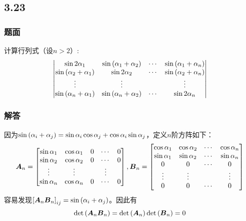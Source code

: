 \documentclass[10pt,xcolor=svgnames]{beamer} %
\begin{document}
\subsection*{3.23}
\begin{frame}
    \frametitle{题面}
    计算行列式（设\(n>2\)）:
    \begin{equation*}
        \begin{vmatrix}
            \sin 2\alpha_1                   & \sin\left( \alpha_{1}+\alpha_{2} \right) & \cdots & \sin\left( \alpha_{1}+\alpha_{n} \right) \\
            \sin\left( \alpha_{2}+\alpha_{1} \right) & \sin 2\alpha_2                   & \cdots & \sin\left( \alpha_{2}+\alpha_{n} \right) \\
            \vdots                           & \vdots                           &        & \vdots                           \\
            \sin\left( \alpha_{n}+\alpha_{1} \right) & \sin\left( \alpha_{n}+\alpha_{2} \right) & \cdots & \sin 2\alpha_n
        \end{vmatrix}
    \end{equation*}
\end{frame}
\begin{frame}
    \frametitle{解答}
    因为\(\sin\left( \alpha_i+\alpha_j \right)=\sin\alpha_i\cos\alpha_j+\cos\alpha_i\sin\alpha_j\)，定义\(n\)阶方阵如下：
    \begin{equation*}
        \boldsymbol{A}_n=
        \begin{bmatrix}
            \sin\alpha_{1} & \cos\alpha_{1} & 0 & \cdots & 0 \\
            \sin\alpha_{2} & \cos\alpha_{2} & 0 & \cdots & 0 \\
            \vdots         & \vdots         &   & \vdots     \\
            \sin\alpha_{n} & \cos\alpha_{n} & 0 & \cdots & 0
        \end{bmatrix},
        \boldsymbol{B}_n=
        \begin{bmatrix}
            \cos\alpha_{1} & \cos\alpha_{2} & \cdots & \cos\alpha_{n} \\
            \sin\alpha_{1} & \sin\alpha_{2} & \cdots & \sin\alpha_{n} \\
            0              & 0              & \cdots & 0              \\
            \vdots         & \vdots         &        & \vdots         \\
            0              & 0              & \cdots & 0
        \end{bmatrix}
    \end{equation*}
    容易发现\(\left[ \boldsymbol{A}_n\boldsymbol{B}_n \right]_{ij}=\sin\left( \alpha_i+\alpha_j \right)\)。因此有
    \begin{equation*}
        \mathrm{det}\left( \boldsymbol{A}_n\boldsymbol{B}_n \right)=\mathrm{det}\left( \boldsymbol{A}_n \right)\mathrm{det}\left( \boldsymbol{B}_n \right)=0
    \end{equation*}
\end{frame}
\end{document}
